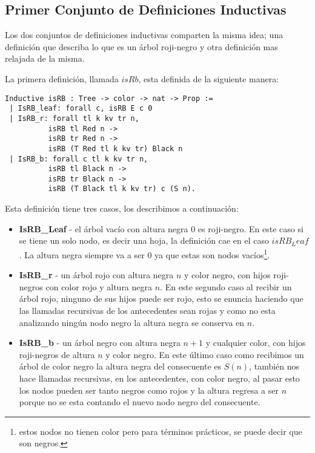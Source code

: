 \documentclass[letterpaper,12pt,oneside]{book}
\newcommand{\arn}{árbol roji-negro}
\theoremstyle{plain}
\theoremstyle{definition}
\theoremstyle{remark}
\begin{document}
\subsection{Primer Conjunto de Definiciones Inductivas}
Los dos conjuntos de definiciones inductivas comparten la misma idea; una definici\'on que describa lo 
que es un {\arn} y otra definici\'on mas relajada de la misma.

La primera definici\'on, llamada $isRb$, esta definida de la siguiente manera: 
\begin{verbatim}
Inductive isRB : Tree -> color -> nat -> Prop :=
 | IsRB_leaf: forall c, isRB E c 0
 | IsRB_r: forall tl k kv tr n,
          isRB tl Red n ->
          isRB tr Red n ->
          isRB (T Red tl k kv tr) Black n
 | IsRB_b: forall c tl k kv tr n,
          isRB tl Black n ->
          isRB tr Black n ->
          isRB (T Black tl k kv tr) c (S n).
\end{verbatim}
Esta definici\'on tiene tres casos, los describimos a continuaci\'on:
\begin{itemize}
        \item \textbf{IsRB\_Leaf} - el árbol vacío con altura negra 0 es roji-negro. En este caso si se 
        tiene un solo nodo, es decir una hoja, la definici\'on cae en el caso $isRB_Leaf$. La altura 
        negra siempre va a ser 0 ya que estas son nodos vacíos\footnote{estos nodos no tienen color pero 
        para términos prácticos, se puede decir que son negros.}.
        \item \textbf{IsRB\_r} - un árbol rojo con altura negra $n$ y color negro, con hijos roji-negros
        con color rojo y altura negra $n$. En este segundo caso al recibir un \'arbol rojo, ninguno de 
        sus hijos puede ser rojo, esto se enuncia haciendo que las llamadas recursivas de los 
        antecedentes sean rojas y como no esta analizando ningún nodo negro la altura negra se conserva 
        en $n$.   
        \item \textbf{IsRB\_b} - un árbol negro con altura negra $n+1$ y cualquier color, con hijos
        roji-negros de altura $n$ y color negro. En este \'ultimo caso como recibimos un \'arbol de color
        negro la altura negra del consecuente es $S(n)$, también nos hace llamadas recursivas, en los 
        antecedentes, con color negro, al pasar esto los nodos pueden ser tanto negros como rojos y la 
        altura regresa a ser $n$ porque no se esta contando el nuevo nodo negro del consecuente.
\end{itemize}
\end{document}
